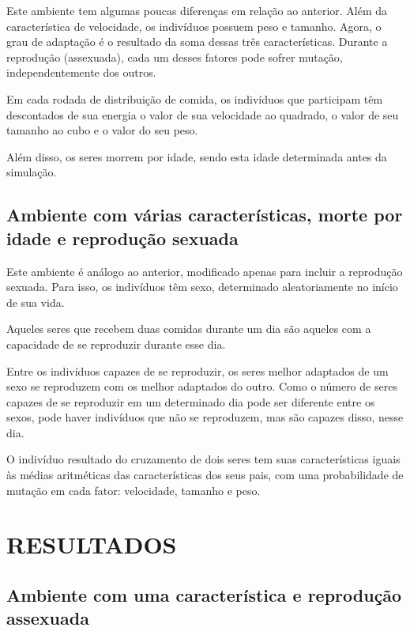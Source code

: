 \documentclass[10pt,brazil,english]{article}
\begin{document}
        Este ambiente tem algumas poucas diferenças em relação ao anterior. Além da característica de velocidade, os indivíduos possuem peso e tamanho. Agora, o grau de adaptação é o resultado da soma dessas três características. Durante a reprodução (assexuada), cada um desses fatores pode sofrer mutação, independentemente dos outros.
        
        Em cada rodada de distribuição de comida, os indivíduos que participam têm descontados de sua energia o valor de sua velocidade ao quadrado, o valor de seu tamanho ao cubo e o valor do seu peso.
        
        Além disso, os seres morrem por idade, sendo esta idade determinada antes da simulação.
        
        \subsection{Ambiente com várias características, morte por idade e reprodução sexuada}
        
        Este ambiente é análogo ao anterior, modificado apenas para incluir a reprodução sexuada. Para isso, os indivíduos têm sexo, determinado aleatoriamente no início de sua vida.
        
        Aqueles seres que recebem duas comidas durante um dia são aqueles com a capacidade de se reproduzir durante esse dia.
        
        Entre os indivíduos capazes de se reproduzir, os seres melhor adaptados de um sexo se reproduzem com os melhor adaptados do outro. Como o número de seres capazes de se reproduzir em um determinado dia pode ser diferente entre os sexos, pode haver indivíduos que não se reproduzem, mas são capazes disso, nesse dia.
        
        O indivíduo resultado do cruzamento de dois seres tem suas características iguais às médias aritméticas das características dos seus pais, com uma probabilidade de mutação em cada fator: velocidade, tamanho e peso.
    
    \section{\uppercase{Resultados}}
    
        \subsection{Ambiente com uma característica e reprodução assexuada}
        
\end{document}
